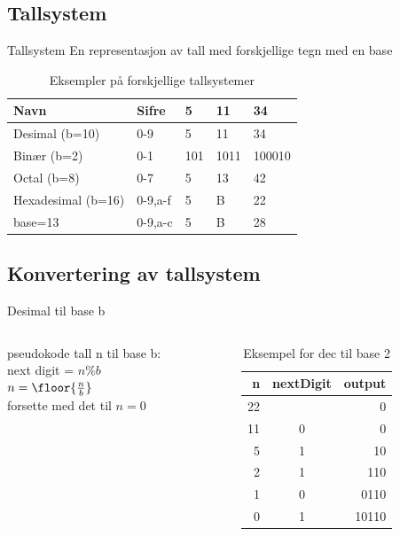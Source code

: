 \subsection*{Tallsystem}
\begin{frame}
\begin{block}{Tallsystem}
En representasjon av tall med forskjellige tegn med en base
\end{block}
\pause

\medskip

\begin{table}[]
\centering
\label{tab:tallsystemer}
\begin{tabular}{l|l|l|l|l}
Navn & Sifre & 5 & 11 & 34 \\ \hline
Desimal (b=10) & 0-9 & 5& 11 & 34 \\
Binær (b=2) & 0-1 & 101 & 1011 & 100010 \\
Octal (b=8) & 0-7 & 5&  13 & 42\\
Hexadesimal (b=16) & 0-9,a-f& 5& B& 22\\
base=13 & 0-9,a-c & 5& B& 28
\end{tabular}
\caption{Eksempler på forskjellige tallsystemer}
\end{table}
\end{frame}

\subsection*{Konvertering av tallsystem}
\begin{frame}[fragile]{Desimal til base b}
\begin{columns}
    \begin{column}{0.30\textwidth}
    \begin{block}{pseudokode}
            tall n til base b:\\
            next digit = $n\%b$\\
            $n=\floor{\frac{n}{b}}$\\
            forsette med det til $n=0$
    \end{block}
    \end{column}
 	\pause
    \begin{column}{0.66\textwidth}
\begin{table}
\begin{tabular}{r|c|r}
n & nextDigit & output \\ \hline
22 & & 0 \\
11 & 0 & 0\\
5 & 1 & 10\\
2 & 1 & 110\\
1 & 0 & 0110\\
0 & 1 & 10110
\end{tabular}
\caption{Eksempel for dec til base 2}
\end{table}
 	\end{column}
 	\end{columns}
\end{frame}

